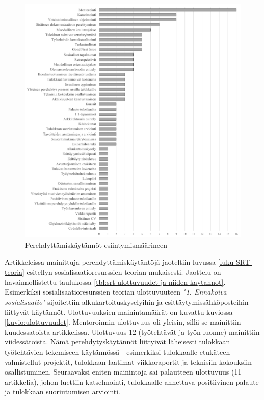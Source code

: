 \documentclass[utf8]{gradu3}
\begin{document}
\begin{figure}[h]
    \centering
    \includegraphics[width=14cm]{media/45-kaytannot.png}
    \caption{Perehdyttämiskäytännöt esiintymismäärineen}
    \label{kuvio:kaytannot}
\end{figure}

Artikkeleissa mainittuja perehdyttämiskäytäntöjä jaoteltiin luvussa \ref{luku-SRT-teoria} esitellyn sosialisaatioresurssien teorian mukaisesti. Jaottelu on havainnollistettu taulukossa \ref{tbl:srt-ulottuvuudet-ja-niiden-kaytannot}. Esimerkiksi sosialisaatioresurssien teorian ulottuvuuteen \textit{"1. Ennakoiva sosialisaatio"} sijoitettiin alkukartoituskyselyihin ja esittäytymissähköposteihin liittyvät käytännöt. Ulottuvuuksien mainintamäärät on kuvattu kuviossa \ref{kuvio:ulottuvuudet}. Mentoroinnin ulottuvuus oli yleisin, sillä se mainittiin kuudessatoista artikkelissa. Ulottuvuus 12 (työtehtävät ja työn luonne) mainittiin viidessätoista. Nämä perehdytyskäytännöt liittyivät läheisesti tulokkaan työtehtävien tekemiseen käytännössä - esimerkiksi tulokkaalle etukäteen valmistellut projektit, tulokkaan laatimat viikkoraportit ja teknisiin kokouksiin osallistuminen. Seuraavaksi eniten mainintoja sai palautteen ulottuvuus (11 artikkelia), johon luettiin katselmointi, tulokkaalle annettava positiivinen palaute ja tulokkaan suoriutumisen arviointi.
\end{document}
